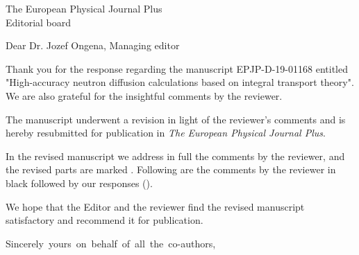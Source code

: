 \documentclass[11pt]{letter} %
\newcommand{\revised}[1]{{\color{red}{#1}}}
\begin{document}

\begin{letter}{The European Physical Journal Plus \\
Editorial board}

\signature{
	\vspace{-30pt}
	Erez Gilad, PhD \\
	\mbox{Ben-Gurion University of the Negev}\\
	E-mail: gilade@bgu.ac.il
} %

\opening{Dear Dr. Jozef Ongena, Managing editor\\} 

Thank you for the response regarding the manuscript EPJP-D-19-01168 entitled "High-accuracy neutron diffusion calculations based on integral transport theory". We are also grateful for the insightful comments by the reviewer. 

The manuscript underwent a revision in light of the reviewer's comments and is hereby resubmitted for publication in \textit{The European Physical Journal Plus}. 

In the revised manuscript we address in full the comments by the reviewer, and the revised parts are marked \revised{in red}. Following are the comments by the reviewer in black followed by our responses (\revised{in red}).  

We hope that the Editor and the reviewer find the revised manuscript satisfactory and recommend it for publication. 

\closing{\mbox{Sincerely yours on behalf of all the co-authors,}}



\newpage


\end{letter}
\end{document}
